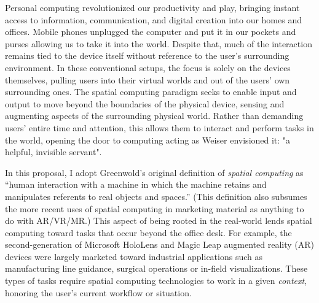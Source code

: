 \documentclass [11pt, proquest] {uwthesis}[2020/02/24]
\begin{document}
Personal computing revolutionized our productivity and play, bringing instant access to information, communication, and digital creation into our homes and offices. Mobile phones unplugged the computer and put it in our pockets and purses allowing us to take it into the world. Despite that, much of the interaction remains tied to the device itself without reference to the user’s surrounding environment. In these conventional setups, the focus is solely on the devices themselves, pulling users into their virtual worlds and out of the users' own surrounding ones. The spatial computing paradigm seeks to enable input and output to move beyond the boundaries of the physical device, sensing and augmenting aspects of the surrounding physical world. Rather than demanding users' entire time and attention, this allows them to interact and perform tasks in the world, opening the door to computing acting as Weiser envisioned it: "a helpful, invisible servant".



In this proposal, I adopt Greenwold's original definition of \textit{spatial computing} as ``human interaction with a machine in which the machine retains and manipulates referents to real objects and spaces.'' (This definition also subsumes the more recent uses of spatial computing in marketing material as anything to do with AR/VR/MR.) This aspect of being rooted in the real-world lends spatial computing toward tasks that occur beyond the office desk. For example, the second-generation of Microsoft HoloLens and Magic Leap augmented reality (AR) devices were largely marketed toward industrial applications such as manufacturing line guidance, surgical operations or in-field visualizations. These types of tasks require spatial computing technologies to work in a given \textit{context}, honoring the user’s current workflow or situation. 
 
\end{document}
